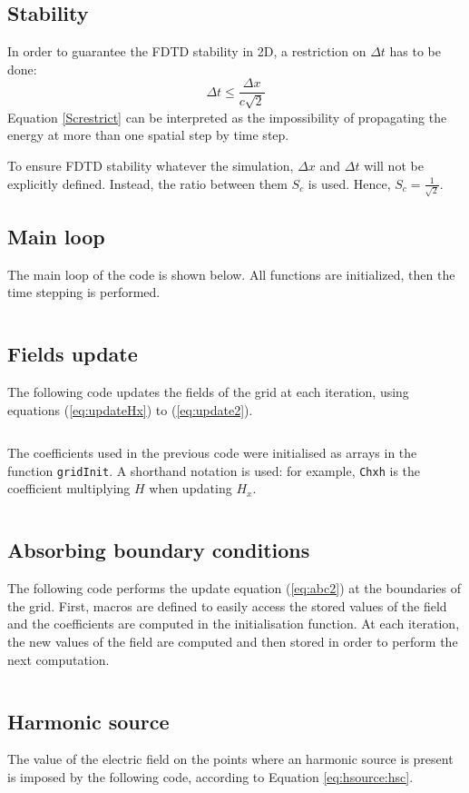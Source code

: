 \subsection{Stability}\label{subsec:im:stab}
In order to guarantee the FDTD stability in 2D, a restriction on $\Delta t$ has to be done:
\begin{equation}\label{Screstrict}
    \Delta t \leq \frac{\Delta x}{c\sqrt{2}}
\end{equation}
Equation \eqref{Screstrict} can be interpreted as the impossibility of propagating the energy at more than one spatial step by time step.

To ensure FDTD stability whatever the simulation, $\Delta x$ and $\Delta t$ will not be explicitly defined. Instead, the ratio between them $S_c$ is used. Hence, $S_c=\frac{1}{\sqrt{2}}$.

\subsection{Main loop}

The main loop of the code is shown below. All functions are initialized, then the time stepping is performed.
{
\inputminted{c}{codes/tmzdemo1.c}}

\subsection{Fields update}\label{sec:codefields}

The following code updates the fields of the grid at each iteration, using equations (\ref{eq:updateHx}) to (\ref{eq:update2}).

{
\inputminted{c}{codes/updatetmz.c}}

The coefficients used in the previous code were initialised as arrays in the function \texttt{gridInit}. A shorthand notation is used: for example, \texttt{Chxh} is the coefficient multiplying $H$ when updating $H_x$.

{
\inputminted{c}{codes/gridtmz.c}}

\subsection{Absorbing boundary conditions}

The following code performs the update equation (\ref{eq:abc2}) at the boundaries of the grid. First, macros are defined to easily access the stored values of the field and the coefficients are computed in the initialisation function. At each iteration, the new values of the field are computed and then stored in order to perform the next computation.

{
\inputminted{c}{codes/abctmz.c}}

\subsection{Harmonic source}

The value of the electric field on the points where an harmonic source is present is imposed by the following code, according to Equation \ref{eq:hsource:hsc}.

{
\inputminted{c}{codes/harmonic.c}}